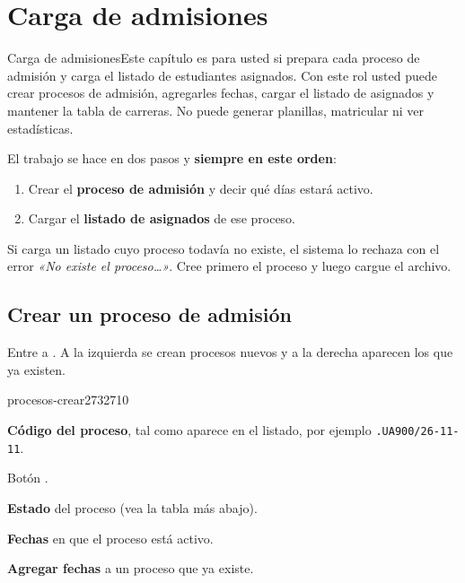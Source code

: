 \chapter{Carga de admisiones}\label{cap:carga}

\begin{ficharol}{Carga de admisiones}{Este capítulo es para usted si prepara cada proceso de
  admisión y carga el listado de estudiantes asignados.}
Con este rol usted puede crear procesos de admisión, agregarles fechas, cargar el listado de
asignados y mantener la tabla de carreras. No puede generar planillas, matricular ni ver
estadísticas.
\end{ficharol}

El trabajo se hace en dos pasos y \textbf{siempre en este orden}:

\begin{enumerate}
  \item Crear el \textbf{proceso de admisión} y decir qué días estará activo.
  \item Cargar el \textbf{listado de asignados} de ese proceso.
\end{enumerate}

\begin{importante}
Si carga un listado cuyo proceso todavía no existe, el sistema lo rechaza con el error
\emph{«No existe el proceso…»}. Cree primero el proceso y luego cargue el archivo.
\end{importante}

\section{Crear un proceso de admisión}

Entre a . A la izquierda se crean procesos nuevos y a la
derecha aparecen los que ya existen.

\begin{captura}{procesos-crear}{2732}{710}
\end{captura}

\begin{leyenda}
  \item[1] \textbf{Código del proceso}, tal como aparece en el listado, por ejemplo
        \texttt{.UA900/26-11-11}.
  \item[2] Botón .
  \item[3] \textbf{Estado} del proceso (vea la tabla más abajo).
  \item[4] \textbf{Fechas} en que el proceso está activo.
  \item[5] \textbf{Agregar fechas} a un proceso que ya existe.
\end{leyenda}

